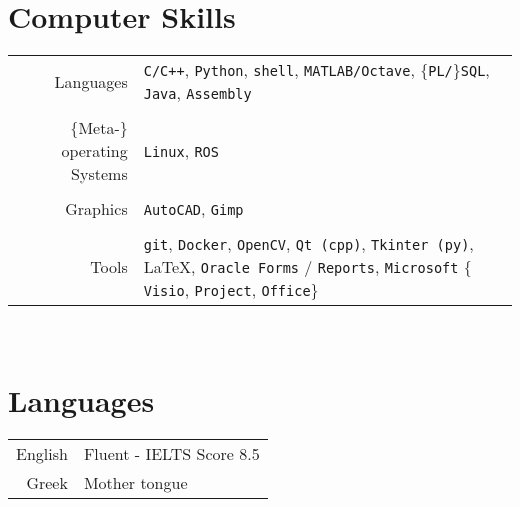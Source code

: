 \documentclass[a4paper,10pt,twoside]{article}
\begin{document}






\section{Computer Skills}

\begin{tabular}{rp{9cm}}
  Languages & \texttt{C/C++}, \texttt{Python}, \texttt{shell}, \texttt{MATLAB/Octave}, $\{$\texttt{PL/}$\}$\texttt{SQL}, \texttt{Java}, \texttt{Assembly}\\
&\\
  $\{$Meta-$\}$operating Systems & \texttt{Linux}, \texttt{ROS} \\
&\\
  Graphics & \texttt{AutoCAD}, \texttt{Gimp}\\
&\\
  Tools & \texttt{git}, \texttt{Docker}, \texttt{OpenCV}, \texttt{Qt (cpp)}, \texttt{Tkinter (py)}, \LaTeX, \texttt{Oracle Forms} / \texttt{Reports}, \texttt{Microsoft} $\{$\texttt{Visio}, \texttt{Project}, \texttt{Office}$\}$
\end{tabular}\\



\section{Languages}

\begin{tabular}{rp{12cm}}
English & Fluent - IELTS Score 8.5\\
Greek & Mother tongue
\end{tabular}\\
\end{document}
